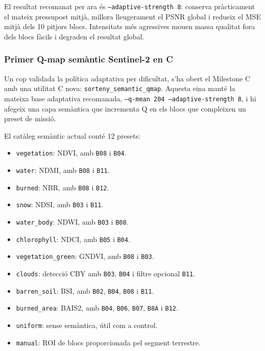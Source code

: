 \documentclass[11pt,a4paper]{article}
\begin{document}
El resultat recomanat per ara és \texttt{--adaptive-strength 8}: conserva pràcticament el mateix pressupost mitjà, millora lleugerament el PSNR global i redueix el MSE mitjà dels 10 pitjors blocs. Intensitats més agressives mouen massa qualitat fora dels blocs fàcils i degraden el resultat global.

\subsubsection{Primer Q-map semàntic Sentinel-2 en C}

Un cop validada la política adaptativa per dificultat, s'ha obert el Milestone C amb una utilitat C nova: \texttt{sorteny\_semantic\_qmap}. Aquesta eina manté la mateixa base adaptativa recomanada, \texttt{--q-mean 204 --adaptive-strength 8}, i hi afegeix una capa semàntica que incrementa Q en els blocs que compleixen un preset de missió.

El catàleg semàntic actual conté 12 presets:

\begin{itemize}
  \item \texttt{vegetation}: NDVI, amb \texttt{B08} i \texttt{B04}.
  \item \texttt{water}: NDMI, amb \texttt{B08} i \texttt{B11}.
  \item \texttt{burned}: NBR, amb \texttt{B08} i \texttt{B12}.
  \item \texttt{snow}: NDSI, amb \texttt{B03} i \texttt{B11}.
  \item \texttt{water\_body}: NDWI, amb \texttt{B03} i \texttt{B08}.
  \item \texttt{chlorophyll}: NDCI, amb \texttt{B05} i \texttt{B04}.
  \item \texttt{vegetation\_green}: GNDVI, amb \texttt{B08} i \texttt{B03}.
  \item \texttt{clouds}: detecció CBY amb \texttt{B03}, \texttt{B04} i filtre opcional \texttt{B11}.
  \item \texttt{barren\_soil}: BSI, amb \texttt{B02}, \texttt{B04}, \texttt{B08} i \texttt{B11}.
  \item \texttt{burned\_area}: BAIS2, amb \texttt{B04}, \texttt{B06}, \texttt{B07}, \texttt{B8A} i \texttt{B12}.
  \item \texttt{uniform}: sense semàntica, útil com a control.
  \item \texttt{manual}: ROI de blocs proporcionada pel segment terrestre.
\end{itemize}
\end{document}
